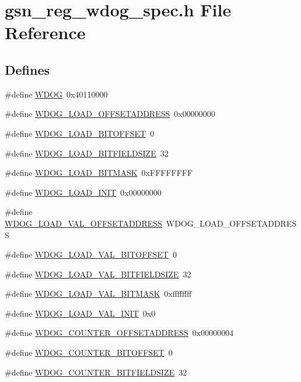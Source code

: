 \hypertarget{a00577}{
\section{gsn\_\-reg\_\-wdog\_\-spec.h File Reference}
\label{a00577}
}
\subsection*{Defines}
\begin{DoxyCompactItemize}
\item 
\#define \hyperlink{a00577_ab938901a5fa5443253fc293ebd0399e3}{WDOG}~0x40110000
\item 
\#define \hyperlink{a00577_a20047642a6650fc3db8b7c83e12e8161}{WDOG\_\-LOAD\_\-OFFSETADDRESS}~0x00000000
\item 
\#define \hyperlink{a00577_ae6f564da0564f68efe50d10db0b88a9e}{WDOG\_\-LOAD\_\-BITOFFSET}~0
\item 
\#define \hyperlink{a00577_a5f5eb49649ef4f62eb74fd68a25db46f}{WDOG\_\-LOAD\_\-BITFIELDSIZE}~32
\item 
\#define \hyperlink{a00577_afcb94e5491a9e62010275ac3a6426141}{WDOG\_\-LOAD\_\-BITMASK}~0xFFFFFFFF
\item 
\#define \hyperlink{a00577_a253f20484f02bacd0e5f3cb2678cae7b}{WDOG\_\-LOAD\_\-INIT}~0x00000000
\item 
\#define \hyperlink{a00577_acbf2a1d88a2cf2a8089cf69d54d09dae}{WDOG\_\-LOAD\_\-VAL\_\-OFFSETADDRESS}~WDOG\_\-LOAD\_\-OFFSETADDRESS
\item 
\#define \hyperlink{a00577_a277867f853d137e306be1b2a9af141b3}{WDOG\_\-LOAD\_\-VAL\_\-BITOFFSET}~0
\item 
\#define \hyperlink{a00577_abc3bf8eb7f0e24ddb67ea610dac16eef}{WDOG\_\-LOAD\_\-VAL\_\-BITFIELDSIZE}~32
\item 
\#define \hyperlink{a00577_a2554e5e63a07a3150c07ec7588eaeb8c}{WDOG\_\-LOAD\_\-VAL\_\-BITMASK}~0xffffffff
\item 
\#define \hyperlink{a00577_a20c4543485afcc24617b3e9f72aef058}{WDOG\_\-LOAD\_\-VAL\_\-INIT}~0x0
\item 
\#define \hyperlink{a00577_ae8fd51ae6061a4a38428e6ce2e91a8f0}{WDOG\_\-COUNTER\_\-OFFSETADDRESS}~0x00000004
\item 
\#define \hyperlink{a00577_a63044e075be43215e7fb4287d48bbc9d}{WDOG\_\-COUNTER\_\-BITOFFSET}~0
\item 
\#define \hyperlink{a00577_a5f82ed8869f21a6dba34c02b54a3704e}{WDOG\_\-COUNTER\_\-BITFIELDSIZE}~32

\end{DoxyCompactItemize}
